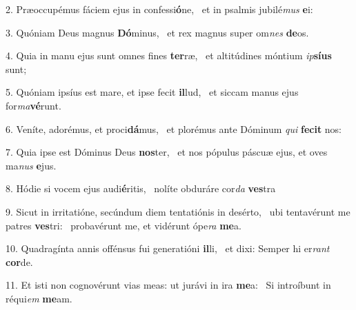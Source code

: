 2. Præoccupémus fáciem ejus in confessi\textbf{ó}ne, \ast\  et in psalmis jubilé\textit{mus} \textbf{e}i:\

3. Quóniam Deus magnus \textbf{Dó}minus, \ast\  et rex magnus super om\textit{nes} \textbf{de}os.\

4. Quia in manu ejus sunt omnes fines \textbf{ter}ræ, \ast\  et altitúdines móntium \textit{ip}\textbf{sí}\textbf{us} sunt;\

5. Quóniam ipsíus est mare, et ipse fecit \textbf{il}lud, \ast\  et siccam manus ejus for\textit{ma}\textbf{vé}runt.\

6. Veníte, adorémus, et proci\textbf{dá}mus, \ast\  et plorémus ante Dóminum \textit{qui} \textbf{fe}\textbf{cit} nos:\

7. Quia ipse est Dóminus Deus \textbf{nos}ter, \ast\  et nos pópulus páscuæ ejus, et oves ma\textit{nus} \textbf{e}jus.\

8. Hódie si vocem ejus audi\textbf{é}ritis, \ast\  nolíte obduráre cor\textit{da} \textbf{ves}tra\

9. Sicut in irritatióne, secúndum diem tentatiónis in desérto, \dag\  ubi tentavérunt me patres \textbf{ves}tri: \ast\  probavérunt me, et vidérunt ópe\textit{ra} \textbf{me}a.\

10. Quadragínta annis offénsus fui generatióni \textbf{il}li, \ast\  et dixi: Semper hi er\textit{rant} \textbf{cor}de.\

11. Et isti non cognovérunt vias meas: ut jurávi in ira \textbf{me}a: \ast\  Si introíbunt in réqui\textit{em} \textbf{me}am.\

